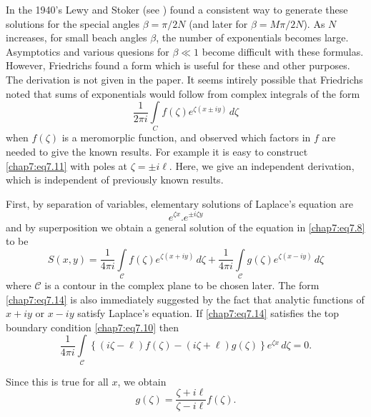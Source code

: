 In the 1940's Lewy and Stoker (see \cite{key10}) found a consistent way to generate these solutions for the special angles $\beta =\pi/2N$ (and later for $\beta =M\pi/2N$). As $N$ increases, for small beach angles $\beta$, the number of exponentials becomes large. Asymptotics and various quesions for $\beta\ll 1$ become difficult with these formulas. However, Friedrichs \cite{key12} found a form which is useful for these and other purposes. The derivation is not given in the paper. It seems intirely possible that Friedrichs noted that sums of exponentials would follow from complex integrals of the form 
$$
\frac{1}{2\pi i}\int\limits_Cf(\zeta)e^{\zeta(x\pm iy)}\,d\zeta
$$\pageoriginale
when $f(\zeta)$ is a meromorplic function, and observed which factors in $f$ are needed to give the known results. For example it is easy to construct \eqref{chap7:eq7.11} with poles at $\zeta=\pm i\ell$. Here, we give an independent derivation, which is independent of previously known results.

First, by separation of variables, elementary solutions of Laplace's equation are 
\begin{equation}
e^{\zeta x}.e^{\pm i\zeta y}\tag{7.13}\label{chap7:eq7.13}
\end{equation}
and by superposition we obtain a general solution of the equation in \eqref{chap7:eq7.8} to be 
\begin{equation}
S(x,y)=\frac{1}{4\pi i}\int\limits_{\mathscr{C}}f(\zeta)e^{\zeta(x+iy)}\,d\zeta+ \frac{1}{4\pi i}\int\limits_{\mathscr{C}}g(\zeta)e^{\zeta(x-iy)}\,d\zeta \tag{7.14}\label{chap7:eq7.14}
\end{equation}
where $\mathscr{C}$ is a contour in the complex plane to be chosen later. The form \eqref{chap7:eq7.14} is also immediately suggested by the fact that analytic functions of $x+iy$ or $x-iy$ satisfy Laplace's equation. If \eqref{chap7:eq7.14} satisfies the top boundary condition \eqref{chap7:eq7.10} then 
$$
\frac{1}{4\pi i}\int\limits_{\mathscr{C}}\left\{(i\zeta -\ell)f(\zeta)-(i\zeta +\ell)g(\zeta)\right\}e^{\zeta x}\,d\zeta =0.
$$

Since this is true for all $x$, we obtain
\begin{equation}
g(\zeta)=\frac{\zeta +i\ell}{\zeta - i\ell}f(\zeta). \tag{7.15}\label{chap7:eq7.15}
\end{equation}

